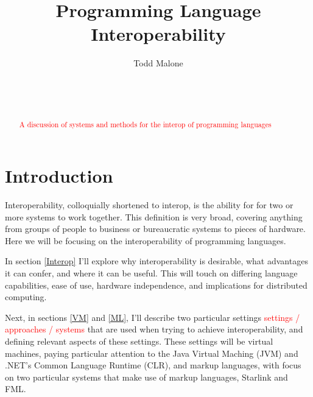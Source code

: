 \documentclass{sig-alternate}
\newcommand{\mycomment}[1]{\textcolor{red}{#1}}
\begin{document}

\title{Programming Language Interoperability}


\author{
\alignauthor
Todd Malone\\
	\\
	\\
	\\
}

\maketitle
\begin{abstract}
\mycomment{A discussion of systems and methods for the interop of programming languages}
\end{abstract}


\section{Introduction}
Interoperability, colloquially shortened to interop, is the ability for for two or more systems to work together. This definition is very broad, covering anything from groups of people to business or bureaucratic systems to pieces of hardware. Here we will be focusing on the interoperability of programming languages.

In section \ref{Interop} I'll explore why interoperability is desirable, what advantages it can confer, and where it can be useful. This will touch on differing language capabilities, ease of use, hardware independence, and implications for distributed computing.

Next, in sections \ref{VM} and \ref{ML}, I'll describe two particular settings \mycomment{settings / approaches / systems} that are used when trying to achieve interoperability, and defining relevant aspects of these settings. These settings will be virtual machines, paying particular attention to the Java Virtual Maching (JVM) and .NET's Common Language Runtime (CLR), and markup languages, with focus on two particular systems that make use of markup languages, Starlink and FML.
\end{document}
